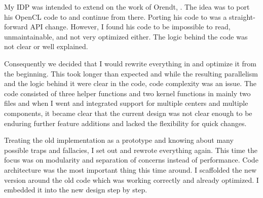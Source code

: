 My IDP was intended to extend on the work of Orendt, \cite{orend10numerische}. The idea was to port his OpenCL code to \cuda{} and continue from there.
Porting his code to \cuda{} was a straight-forward API change. However, I found his code to be impossible to read, unmaintainable, and not very optimized either. The logic behind the code was not clear or well explained.

Consequently we decided that I would rewrite everything in \cuda{} and optimize it from the beginning. This took longer than expected and while the resulting parallelism and the logic behind it were clear in the code, code complexity was an issue. The code consisted of three helper functions and two kernel functions in mainly two files and when I went and integrated support for multiple centers and multiple components, it became clear that the current design was not clear enough to be enduring further feature additions and lacked the flexibility for quick changes.

Treating the old implementation as a prototype and knowing about many possible traps and fallacies, I set out and rewrote everything again. This time the focus was on modularity and separation of concerns instead of performance. Code architecture was the most important thing this time around. I scaffolded the new version around the old code which was working correctly and already optimized. I embedded it into the new design step by step.